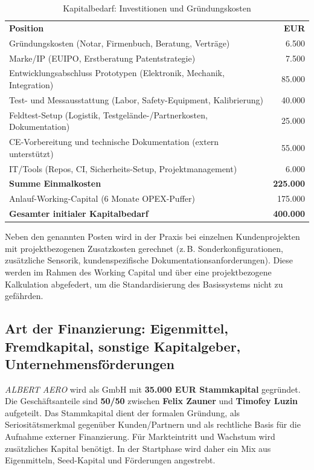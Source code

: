 \documentclass[11pt,a4paper]{article}
\begin{document}
\begin{table}[htbp]
\centering
\caption{Kapitalbedarf: Investitionen und Gründungskosten}
\label{tab:kapitalbedarf}
\renewcommand{\arraystretch}{1.1}
\begin{tabular}{p{} r}
\textbf{Position} & \textbf{EUR}\\
Gründungskosten (Notar, Firmenbuch, Beratung, Verträge) & 6.500\\
Marke/IP (EUIPO, Erstberatung Patentstrategie) & 7.500\\
Entwicklungsabschluss Prototypen (Elektronik, Mechanik, Integration) & 85.000\\
Test- und Messausstattung (Labor, Safety-Equipment, Kalibrierung) & 40.000\\
Feldtest-Setup (Logistik, Testgelände-/Partnerkosten, Dokumentation) & 25.000\\
CE-Vorbereitung und technische Dokumentation (extern unterstützt) & 55.000\\
IT/Tools (Repos, CI, Sicherheits-Setup, Projektmanagement) & 6.000\\
\textbf{Summe Einmalkosten} & \textbf{225.000}\\
Anlauf-Working-Capital (6 Monate OPEX-Puffer) & 175.000\\
\textbf{Gesamter initialer Kapitalbedarf} & \textbf{400.000}\\
\end{tabular}
\end{table}

Neben den genannten Posten wird in der Praxis bei einzelnen Kundenprojekten mit projektbezogenen Zusatzkosten gerechnet (z.\,B. Sonderkonfigurationen, zusätzliche Sensorik, kundenspezifische Dokumentationsanforderungen). Diese werden im Rahmen des Working Capital und über eine projektbezogene Kalkulation abgefedert, um die Standardisierung des Basissystems nicht zu gefährden.

\subsection{Art der Finanzierung: Eigenmittel, Fremdkapital, sonstige Kapitalgeber, Unternehmensförderungen}
\textit{ALBERT AERO} wird als GmbH mit \textbf{35.000 EUR Stammkapital} gegründet. Die Geschäftsanteile sind \textbf{50/50} zwischen \textbf{Felix Zauner} und \textbf{Timofey Luzin} aufgeteilt. Das Stammkapital dient der formalen Gründung, als Seriositätsmerkmal gegenüber Kunden/Partnern und als rechtliche Basis für die Aufnahme externer Finanzierung. Für Markteintritt und Wachstum wird zusätzliches Kapital benötigt. In der Startphase wird daher ein Mix aus Eigenmitteln, Seed-Kapital und Förderungen angestrebt.
\end{document}
